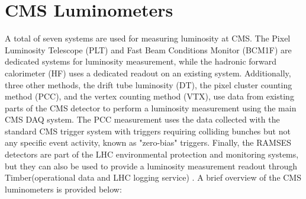\section{CMS Luminometers}

A total of seven systems are used for measuring luminosity at CMS. The Pixel Luminosity Telescope (PLT) and Fast Beam Conditions Monitor (BCM1F) are dedicated systems for luminosity measurement, while the hadronic forward calorimeter (HF) uses a dedicated readout on an existing system. Additionally, three other methods, the drift tube luminosity (DT), the pixel cluster counting method (PCC), and the vertex counting method (VTX), use data from existing parts of the CMS detector to perform a luminosity measurement using the main CMS DAQ system. The PCC measurement uses the data collected with the standard CMS trigger system with triggers requiring colliding bunches but not any specific event activity, known as "zero-bias" triggers. Finally, the RAMSES detectors are part of the LHC environmental protection and monitoring systems, but they can also be used to provide a luminosity measurement readout through Timber(operational data and LHC logging service) \cite{pas_18}.  A brief overview of the CMS luminometers is provided below:
